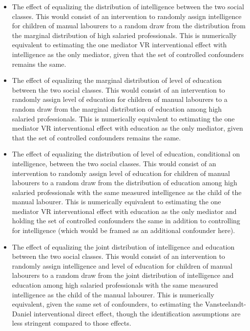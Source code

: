 \begin{itemize}[noitemsep,topsep=0pt]
\item  The effect of equalizing the distribution of intelligence between the two social classes. This would 
consist of an intervention to randomly assign intelligence for children of manual labourers to a random draw
from the distribution from the marginal distribution of high salaried professionals. This is numerically 
equivalent to estimating the one mediator VR interventional effect with intelligence as the only mediator, 
given that the set of controlled confounders remains the same. 
\item  The effect of equalizing the marginal distribution of level of education between the two social classes. 
This would consist of an intervention to randomly assign level of education for children of manual labourers 
to a random draw from the marginal distribution of education among high salaried professionals. This is numerically 
equivalent to estimating the one mediator VR interventional effect with education as the only mediator, 
given that the set of controlled confounders remains the same. 
\item  The effect of equalizing the distribution of level of education, conditional on intelligence,
between the two social classes. This would consist of an intervention to randomly assign level of education 
for children of manual labourers to a random draw from the distribution of education among 
high salaried professionals with the same measured intelligence as the child of the manual labourer. 
This is numerically equivalent to estimating the one mediator VR interventional effect with education as the 
only mediator and holding the set of controlled confounders the same in addition to controlling for intelligence
(which would be framed as an additional confounder here). 
\item  The effect of equalizing the joint distribution of intelligence and education between the two social
classes. This would consist of an intervention to randomly assign intelligence and level of education 
for children of manual labourers to a random draw from the joint distribution of intelligence and education among 
high salaried professionals with the same measured intelligence as the child of the manual labourer. This is 
numerically equivalent, given the same set of confounders, to estimating the Vansteelandt-Daniel interventional 
direct effect, though the identification assumptions are less stringent compared to those effects. 
\end{itemize}

